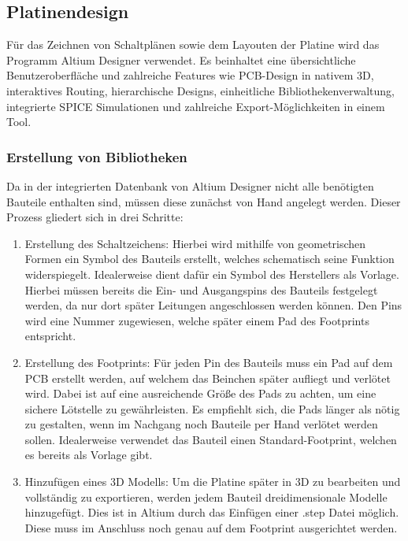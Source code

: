 

\subsection{Platinendesign}

Für das Zeichnen von Schaltplänen sowie dem Layouten der Platine wird das Programm Altium Designer verwendet. Es beinhaltet eine übersichtliche Benutzeroberfläche und zahlreiche Features wie PCB-Design in nativem 3D, interaktives Routing, hierarchische Designs, einheitliche Bibliothekenverwaltung, integrierte SPICE Simulationen und zahlreiche Export-Möglichkeiten in einem Tool. 


\subsubsection{Erstellung von Bibliotheken}
Da in der integrierten Datenbank von Altium Designer nicht alle benötigten Bauteile enthalten sind, müssen diese zunächst von Hand angelegt werden. Dieser Prozess gliedert sich in drei Schritte:

\begin{enumerate}
\item Erstellung des Schaltzeichens: Hierbei wird mithilfe von geometrischen Formen ein Symbol des Bauteils erstellt, welches schematisch seine Funktion widerspiegelt. Idealerweise dient dafür ein Symbol des Herstellers als Vorlage. Hierbei müssen bereits die Ein- und Ausgangspins des Bauteils festgelegt werden, da nur dort später Leitungen angeschlossen werden können. Den Pins wird eine Nummer zugewiesen, welche später einem Pad des Footprints entspricht.

\item Erstellung des Footprints: Für jeden Pin des Bauteils muss ein Pad auf dem PCB erstellt werden, auf welchem das Beinchen später aufliegt und verlötet wird. Dabei ist auf eine ausreichende Größe des Pads zu achten, um eine sichere Lötstelle zu gewährleisten. Es empfiehlt sich, die Pads länger als nötig zu gestalten, wenn im Nachgang noch Bauteile per Hand verlötet werden sollen. Idealerweise verwendet das Bauteil einen Standard-Footprint, welchen es bereits als Vorlage gibt. 

\item Hinzufügen eines 3D Modells: Um die Platine später in 3D zu bearbeiten und vollständig zu exportieren, werden jedem Bauteil dreidimensionale Modelle hinzugefügt. Dies ist in Altium durch das Einfügen einer .step Datei möglich. Diese muss im Anschluss noch genau auf dem Footprint ausgerichtet werden.
\end{enumerate}

